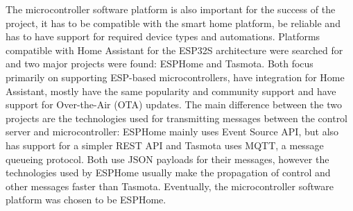 The microcontroller software platform is also important for the success of the project, it has to be compatible with the smart home platform, be reliable and has to have support for required device types and automations. Platforms compatible with Home Assistant for the ESP32S architecture were searched for and two major projects were found: ESPHome and Tasmota. Both focus primarily on supporting ESP-based microcontrollers, have integration for Home Assistant, mostly have the same popularity and community support and have support for Over-the-Air (OTA) updates. \cite{ESPHomeHomepage} \cite{TasmotaHomepage} \cite{ESPHomeOTA} \cite{TasmotaOTA} The main difference between the two projects are the technologies used for transmitting messages between the control server and microcontroller: ESPHome mainly uses Event Source API, but also has support for a simpler REST API and Tasmota uses MQTT, a message queueing protocol. \cite{ESPHomeWebAPI} \cite{TasmotaMQTT} Both use JSON payloads for their messages, however the technologies used by ESPHome usually make the propagation of control and other messages faster than Tasmota. Eventually, the microcontroller software platform was chosen to be ESPHome.
